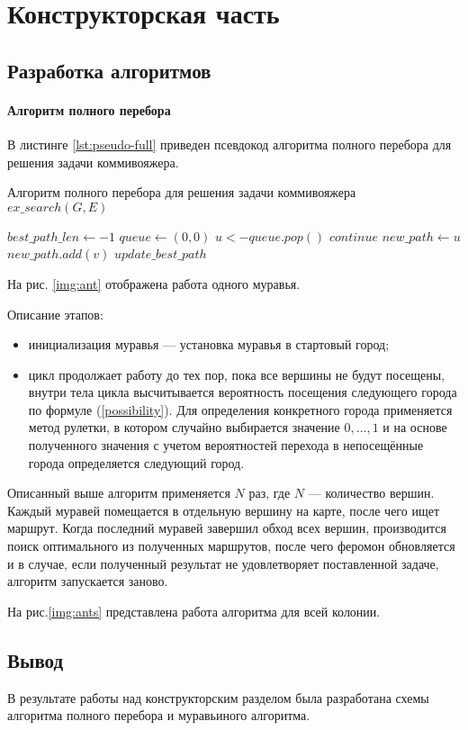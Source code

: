 \chapter{Конструкторская часть}

\section{Разработка алгоритмов}

\subsubsection{Алгоритм полного перебора}

В листинге \ref{lst:pseudo-full} приведен псевдокод алгоритма полного перебора для решения задачи коммивояжера.
\begin{algorithm}
	\caption{\label{lst:pseudo-full}Алгоритм полного перебора для решения задачи коммивояжера $ex\_search(G, E)$}
	\begin{algorithmic}
		\State $best\_path\_len \gets -1$
		\State $queue \gets (0, 0)$
		\State $ u <- queue.pop() $
		\State $continue$
		\EndIf
		\State $ new\_path \gets u $
		\State $ new\_path.add(v) $
		\State $ update\_best\_path $
		\EndFor
		\EndWhile
	\end{algorithmic}
\end{algorithm}

На рис. \ref{img:ant} отображена работа одного муравья.


Описание этапов:
\begin{itemize}
	\item инициализация муравья — установка муравья в стартовый город;
	\item цикл продолжает работу до тех пор, пока все вершины не будут посещены, внутри тела цикла высчитывается вероятность посещения следующего города по формуле (\ref{possibility}). Для определения конкретного города применяется метод рулетки, в котором случайно выбирается значение $ 0, \dots , 1 $ и на основе полученного значения с учетом вероятностей перехода в непосещённые города определяется следующий город.
\end{itemize}

Описанный выше алгоритм применяется $N$ раз, где $N$ — количество вершин.
Каждый муравей помещается в отдельную вершину на карте, после чего ищет маршрут.
Когда последний муравей завершил обход всех вершин, производится поиск оптимального из полученных маршрутов, после чего феромон обновляется и в случае, если полученный результат не удовлетворяет поставленной задаче, алгоритм запускается заново.

На рис.\ref{img:ants} представлена работа алгоритма для всей колонии.


\section*{Вывод}

В результате работы над конструкторским разделом была разработана схемы алгоритма полного перебора и муравьиного алгоритма.
